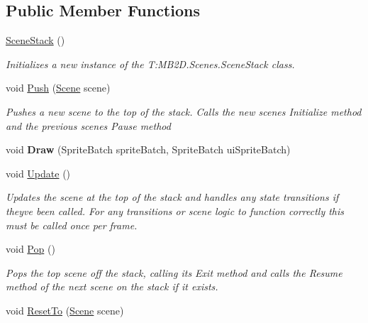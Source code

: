 \subsection*{Public Member Functions}
\begin{DoxyCompactItemize}
\item 
\hyperlink{class_m_b2_d_1_1_scenes_1_1_scene_stack_afae8584f72ea2eb6848af3781e7c4137}{Scene\+Stack} ()
\begin{DoxyCompactList}\small\item\em Initializes a new instance of the T\+:\+M\+B2\+D.\+Scenes.\+Scene\+Stack class. \end{DoxyCompactList}\item 
void \hyperlink{class_m_b2_d_1_1_scenes_1_1_scene_stack_a22760622453ac16621534bc324ec039f}{Push} (\hyperlink{class_m_b2_d_1_1_scenes_1_1_scene}{Scene} scene)
\begin{DoxyCompactList}\small\item\em Pushes a new scene to the top of the stack. Calls the new scenes Initialize method and the previous scenes Pause method \end{DoxyCompactList}\item 
\hypertarget{class_m_b2_d_1_1_scenes_1_1_scene_stack_aad467942bd0fb8029b67af4e981c384a}{}\label{class_m_b2_d_1_1_scenes_1_1_scene_stack_aad467942bd0fb8029b67af4e981c384a} 
void {\bfseries Draw} (Sprite\+Batch sprite\+Batch, Sprite\+Batch ui\+Sprite\+Batch)
\item 
void \hyperlink{class_m_b2_d_1_1_scenes_1_1_scene_stack_a8486b29eb65458e88512989201772984}{Update} ()
\begin{DoxyCompactList}\small\item\em Updates the scene at the top of the stack and handles any state transitions if they\textquotesingle{}ve been called. For any transitions or scene logic to function correctly this must be called once per frame. \end{DoxyCompactList}\item 
void \hyperlink{class_m_b2_d_1_1_scenes_1_1_scene_stack_a134c3aff1731fb86116b78cac7112464}{Pop} ()
\begin{DoxyCompactList}\small\item\em Pops the top scene off the stack, calling its Exit method and calls the Resume method of the next scene on the stack if it exists. \end{DoxyCompactList}\item 
void \hyperlink{class_m_b2_d_1_1_scenes_1_1_scene_stack_a521a38426d3e85caeb53b2909b623562}{Reset\+To} (\hyperlink{class_m_b2_d_1_1_scenes_1_1_scene}{Scene} scene)

\end{DoxyCompactItemize}
